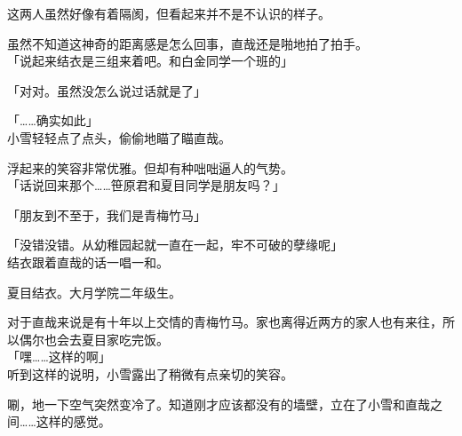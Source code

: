 这两人虽然好像有着隔阂，但看起来并不是不认识的样子。

虽然不知道这神奇的距离感是怎么回事，直哉还是啪地拍了拍手。\\

「说起来结衣是三组来着吧。和白金同学一个班的」

「对对。虽然没怎么说过话就是了」

「……确实如此」\\

小雪轻轻点了点头，偷偷地瞄了瞄直哉。

浮起来的笑容非常优雅。但却有种咄咄逼人的气势。\\

「话说回来那个……笹原君和夏目同学是朋友吗？」

「朋友到不至于，我们是青梅竹马」

「没错没错。从幼稚园起就一直在一起，牢不可破的孽缘呢」\\

结衣跟着直哉的话一唱一和。

夏目结衣。大月学院二年级生。

对于直哉来说是有十年以上交情的青梅竹马。家也离得近两方的家人也有来往，所以偶尔也会去夏目家吃完饭。\\

「嘿……这样的啊」\\

听到这样的说明，小雪露出了稍微有点亲切的笑容。

唰，地一下空气突然变冷了。知道刚才应该都没有的墙壁，立在了小雪和直哉之间……这样的感觉。\\

